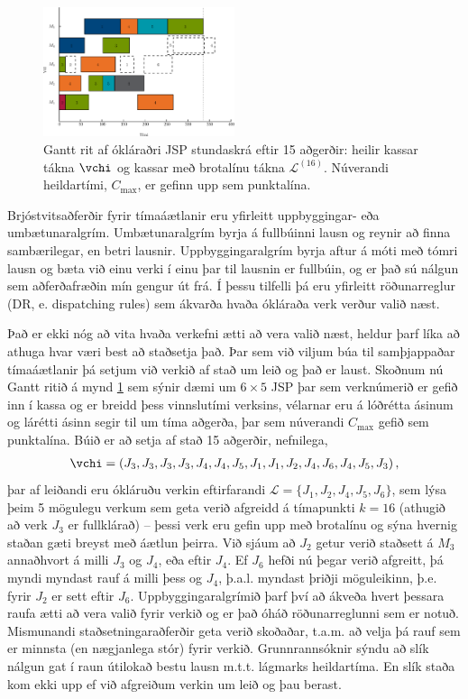 \documentclass[10pt,a4paper]{article}
\begin{document}
\begin{figure}\centering
    \includegraphics[width=0.5\textwidth]{figures/jssp_example.eps}
    \caption[Gantt rit af ókláraðri JSP stundaskrá]{Gantt rit af ókláraðri JSP 
    stundaskrá eftir 15 aðgerðir: heilir kassar tákna $\vchi$ og kassar með 
    brotalínu tákna $\mathcal{L}^{(16)}$. 
    Núverandi heildartími, $C_{\max}$, er gefinn upp sem punktalína.}
    \label{fig:jssp:example}
\end{figure}

Brjóstvitsaðferðir fyrir tímaáætlanir eru yfirleitt uppbyggingar- eða 
umbætunaralgrím.
Umbætunaralgrím byrja á fullbúinni lausn og reynir að finna sambærilegar, en 
betri lausnir. 
Uppbyggingaralgrím byrja aftur á móti með tómri lausn og bæta við einu verki í 
einu þar til lausnin er fullbúin, og er það sú nálgun sem aðferðafræðin mín 
gengur út frá. 
Í þessu tilfelli þá eru yfirleitt röðunarreglur (DR, e. dispatching 
rules) sem ákvarða hvaða ókláraða verk verður valið næst. 

Það er ekki nóg að vita hvaða verkefni ætti að vera valið næst, 
heldur þarf líka að athuga hvar væri best að staðsetja það. 
Þar sem við viljum búa til samþjappaðar tímaáætlanir  þá setjum við verkið af 
stað um leið og það er laust. 
Skoðnum nú Gantt ritið á mynd \ref{fig:jssp:example} sem sýnir dæmi um 
$6\times5$ JSP þar sem verknúmerið er gefið inn í kassa og er breidd þess 
vinnslutími verksins, 
vélarnar eru á lóðrétta ásinum og lárétti ásinn segir til um tíma aðgerða,
þar sem núverandi $C_{\max}$ gefið sem punktalína. 
Búið er að setja af stað 15 aðgerðir, nefnilega, 
\begin{eqnarray}
\vchi=\left(J_3,J_3,J_3,J_3,J_4,J_4,J_5,J_1,J_1,J_2,J_4,J_6,J_4,J_5,J_3\right),
\end{eqnarray}
þar af leiðandi eru ókláruðu verkin eftirfarandi 
$\mathcal{L}=\{J_1,J_2,J_4,J_5,J_6\}$, sem lýsa þeim 5 mögulegu verkum sem geta 
verið afgreidd á tímapunkti $k=16$ (athugið að verk $J_3$ er fullklárað) -- 
þessi verk eru gefin upp með brotalínu og sýna hvernig staðan gæti breyst með 
áætlun þeirra. 
Við sjáum að $J_2$ getur verið staðsett á $M_3$ annaðhvort á milli  $J_3$ og 
$J_4$, eða eftir $J_4$.  Ef $J_6$ hefði nú þegar verið afgreitt, þá myndi 
myndast rauf á milli þess og $J_4$, þ.a.l. myndast þriðji möguleikinn, þ.e. 
fyrir $J_2$ er sett eftir $J_6$. 
Uppbyggingaralgrímið þarf því að ákveða hvert þessara raufa ætti að vera 
valið fyrir verkið og er það óháð röðunarreglunni sem er notuð. 
Mismunandi staðsetningaraðferðir geta verið skoðaðar, t.a.m. að velja þá rauf 
sem er minnsta (en nægjanlega stór) fyrir verkið. Grunnrannsóknir sýndu að 
slík nálgun gat í raun útilokað bestu lausn m.t.t. lágmarks heildartíma. 
En slík staða kom ekki upp ef við afgreiðum verkin um leið og þau berast. 
\end{document}

